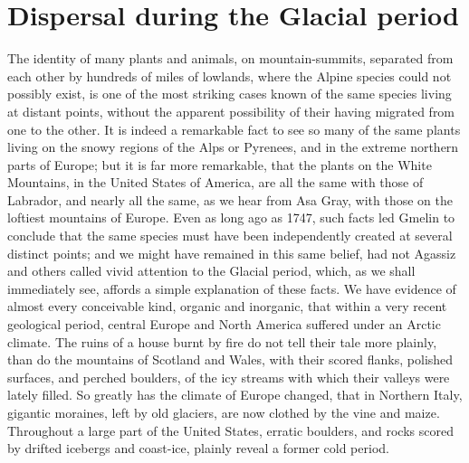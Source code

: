 \section{Dispersal during the Glacial period}
\indent The identity of many plants and animals, on mountain-summits, separated from each other by hundreds of miles of lowlands, where the Alpine species could not possibly exist, is one of the most striking cases known of the same species living at distant points, without the apparent possibility of their having migrated from one to the other. It is indeed a remarkable fact to see so many of the same plants living on the snowy regions of the Alps or Pyrenees, and in the extreme northern parts of Europe; but it is far more remarkable, that the plants on the White Mountains, in the United States of America, are all the same with those of Labrador, and nearly all the same, as we hear from Asa Gray, with those on the loftiest mountains of Europe. Even as long ago as 1747, such facts led Gmelin to conclude that the same species must have been independently created at several distinct points; and we might have remained in this same belief, had not Agassiz and others called vivid attention to the Glacial period, which, as we shall immediately see, affords a simple explanation of these facts. We have evidence of almost every conceivable kind, organic and inorganic, that within a very recent geological period, central Europe and North America suffered under an Arctic climate. The ruins of a house burnt by fire do not tell their tale more plainly, than do the mountains of Scotland and Wales, with their scored flanks, polished surfaces, and perched boulders, of the icy streams with which their valleys were lately filled. So greatly has the climate of Europe changed, that in Northern Italy, gigantic moraines, left by old glaciers, are now clothed by the vine and maize.  Throughout a large part of the United States, erratic boulders, and rocks scored by drifted icebergs and coast-ice, plainly reveal a former cold period.~\\
